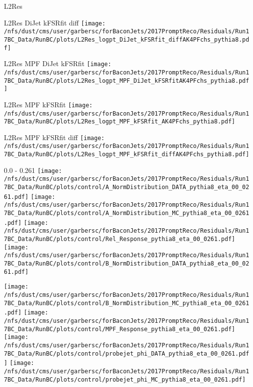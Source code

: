 \documentclass[t,compress]{beamer}
\begin{document}
\begin{frame}{L2Res}
\begin{minipage}{0.24\textwidth}
\tiny  L2Res   DiJet kFSRfit diff   
 \newline
	\texttt{[image: /nfs/dust/cms/user/garbersc/forBaconJets/2017PromptReco/Residuals/Run17BC\_Data/RunBC/plots/L2Res\_logpt\_DiJet\_kFSRfit\_diffAK4PFchs\_pythia8.pdf]}
\end{minipage}
\begin{minipage}{0.24\textwidth}
\tiny  L2Res   MPF DiJet kFSRfit   
 \newline
	\texttt{[image: /nfs/dust/cms/user/garbersc/forBaconJets/2017PromptReco/Residuals/Run17BC\_Data/RunBC/plots/L2Res\_logpt\_MPF\_DiJet\_kFSRfitAK4PFchs\_pythia8.pdf]}
\end{minipage}
\begin{minipage}{0.24\textwidth}
\tiny  L2Res   MPF kFSRfit    
 \newline
	\texttt{[image: /nfs/dust/cms/user/garbersc/forBaconJets/2017PromptReco/Residuals/Run17BC\_Data/RunBC/plots/L2Res\_logpt\_MPF\_kFSRfit\_AK4PFchs\_pythia8.pdf]}
\end{minipage}
\begin{minipage}{0.24\textwidth}
\tiny  L2Res   MPF kFSRfit diff   
 \newline
	\texttt{[image: /nfs/dust/cms/user/garbersc/forBaconJets/2017PromptReco/Residuals/Run17BC\_Data/RunBC/plots/L2Res\_logpt\_MPF\_kFSRfit\_diffAK4PFchs\_pythia8.pdf]}
\end{minipage}
\end{frame}

\begin{frame}{0.0 - 0.261}
	\texttt{[image: /nfs/dust/cms/user/garbersc/forBaconJets/2017PromptReco/Residuals/Run17BC\_Data/RunBC/plots/control/A\_NormDistribution\_DATA\_pythia8\_eta\_00\_0261.pdf]}
	\texttt{[image: /nfs/dust/cms/user/garbersc/forBaconJets/2017PromptReco/Residuals/Run17BC\_Data/RunBC/plots/control/A\_NormDistribution\_MC\_pythia8\_eta\_00\_0261.pdf]}
	\texttt{[image: /nfs/dust/cms/user/garbersc/forBaconJets/2017PromptReco/Residuals/Run17BC\_Data/RunBC/plots/control/Rel\_Response\_pythia8\_eta\_00\_0261.pdf]}
	\texttt{[image: /nfs/dust/cms/user/garbersc/forBaconJets/2017PromptReco/Residuals/Run17BC\_Data/RunBC/plots/control/B\_NormDistribution\_DATA\_pythia8\_eta\_00\_0261.pdf]}
\newline

	\texttt{[image: /nfs/dust/cms/user/garbersc/forBaconJets/2017PromptReco/Residuals/Run17BC\_Data/RunBC/plots/control/B\_NormDistribution\_MC\_pythia8\_eta\_00\_0261.pdf]}
	\texttt{[image: /nfs/dust/cms/user/garbersc/forBaconJets/2017PromptReco/Residuals/Run17BC\_Data/RunBC/plots/control/MPF\_Response\_pythia8\_eta\_00\_0261.pdf]}
	\texttt{[image: /nfs/dust/cms/user/garbersc/forBaconJets/2017PromptReco/Residuals/Run17BC\_Data/RunBC/plots/control/probejet\_phi\_DATA\_pythia8\_eta\_00\_0261.pdf]}
	\texttt{[image: /nfs/dust/cms/user/garbersc/forBaconJets/2017PromptReco/Residuals/Run17BC\_Data/RunBC/plots/control/probejet\_phi\_MC\_pythia8\_eta\_00\_0261.pdf]}
\end{frame}
\end{document}
